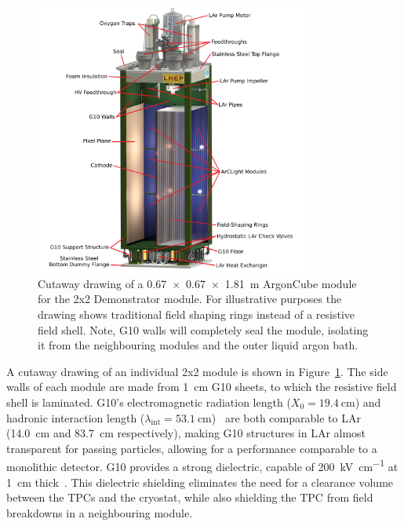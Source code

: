 \begin{figure}[tbp]
  \centering
  \includegraphics[width=0.8\textwidth]{plots/Normal-Module-4K_labelled}
  \caption[ArgonCube module engineering drawing]{Cutaway drawing of a \SI{0.67 x 0.67 x 1.81}{\metre} ArgonCube module for the 2x2 Demonstrator module. For illustrative purposes the drawing shows traditional field shaping rings instead of a resistive field shell. Note, G10 walls will completely seal the module, isolating it from the neighbouring modules and the outer liquid argon bath.}
  \label{fig:ac_module}
\end{figure}

A cutaway drawing of an individual 2x2 module is shown in Figure~\ref{fig:ac_module}. The side walls of each module are made from \SI{1}{\centi\metre} G10 sheets, to which the resistive field shell is laminated. G10's electromagnetic radiation length ($X_{\mathrm{0}} = \SI{19.4}{\centi\metre}$) and hadronic interaction length ($\lambda_{\mathrm{int}} = \SI{53.1}{\centi\metre}$)~\cite{pdg_g10} are both comparable to LAr (14.0~cm and 83.7~cm respectively), making G10 structures in LAr almost transparent for passing particles, allowing for a performance comparable to a monolithic detector. G10 provides a strong dielectric, capable of \SI{200}{\kilo\volt\per\centi\metre} at \SI{1}{\centi\metre} thick~\cite{G10Breakdown}. This dielectric shielding eliminates the need for a clearance volume between the TPCs and the cryostat, while also shielding the TPC from field breakdowns in a neighbouring module. 

